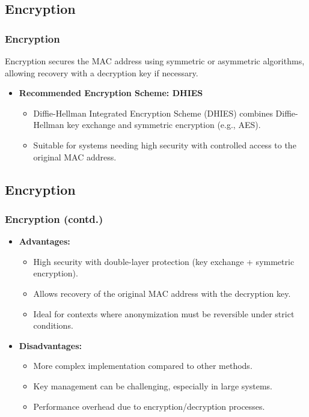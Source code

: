 \documentclass[
	11pt, %
]{beamer}
\begin{document}
\begin{frame}
  \section{Encryption}
  \frametitle{Encryption}
  Encryption secures the MAC address using symmetric or asymmetric algorithms, allowing recovery with a decryption key if necessary.
  \begin{itemize}
    \item \textbf{Recommended Encryption Scheme: DHIES} \pause
      \begin{itemize}
        \item Diffie-Hellman Integrated Encryption Scheme (DHIES) combines Diffie-Hellman key exchange and symmetric encryption (e.g., AES). \pause
        \item Suitable for systems needing high security with controlled access to the original MAC address.
      \end{itemize}
  \end{itemize}
\end{frame}

\begin{frame}
  \section{Encryption}
  \frametitle{Encryption (contd.)}
  \begin{itemize}
    \item \textbf{Advantages:} \pause
      \begin{itemize}
        \item High security with double-layer protection (key exchange + symmetric encryption). \pause
        \item Allows recovery of the original MAC address with the decryption key. \pause
        \item Ideal for contexts where anonymization must be reversible under strict conditions. \pause
      \end{itemize}
    \item \textbf{Disadvantages:} \pause
      \begin{itemize}
        \item More complex implementation compared to other methods. \pause
        \item Key management can be challenging, especially in large systems. \pause
        \item Performance overhead due to encryption/decryption processes. 
      \end{itemize}
  \end{itemize}
\end{frame}
\end{document}
